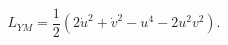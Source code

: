 \begin{equation}
\label{axiym} L_{YM}=\frac12 (2\dot{u}^2+\dot{v}^2-u^4-2 u^2 v^2).
\end{equation}

